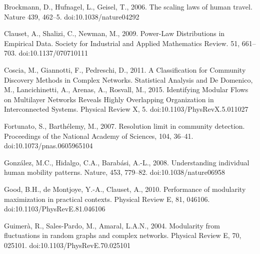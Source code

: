 \documentclass[]{tGIS2e}
\begin{document}


\begin{thebibliography}{9}


Brockmann, D., Hufnagel, L., Geisel, T., 2006. The scaling laws of human travel. Nature 439, 462–5. doi:10.1038/nature04292

Clauset, A., Shalizi, C., Newman, M., 2009. Power-Law Distributions in Empirical Data. Society for Industrial and Applied Mathematics Review. 51, 661–703. doi:10.1137/070710111

Coscia, M., Giannotti, F., Pedreschi, D., 2011. A Classification for Community Discovery Methods in Complex Networks. Statistical Analysis and 
De Domenico, M., Lancichinetti, A., Arenas, A., Rosvall, M., 2015. Identifying Modular Flows on Multilayer Networks Reveals Highly Overlapping Organization in Interconnected Systems. Physical Review X, 5. doi:10.1103/PhysRevX.5.011027

Fortunato, S., Barthélemy, M., 2007. Resolution limit in community detection. Proceedings of the National Academy of Sciences, 104, 36–41. doi:10.1073/pnas.0605965104

González, M.C., Hidalgo, C.A., Barabási, A.-L., 2008. Understanding individual human mobility patterns. Nature, 453, 779–82. doi:10.1038/nature06958

Good, B.H., de Montjoye, Y.-A., Clauset, A., 2010. Performance of modularity maximization in practical contexts. Physical Review E, 81, 046106. doi:10.1103/PhysRevE.81.046106

Guimerà, R., Sales-Pardo, M., Amaral, L.A.N., 2004. Modularity from fluctuations in random graphs and complex networks. Physical Review E, 70, 025101. doi:10.1103/PhysRevE.70.025101


\end{thebibliography}
\end{document}
